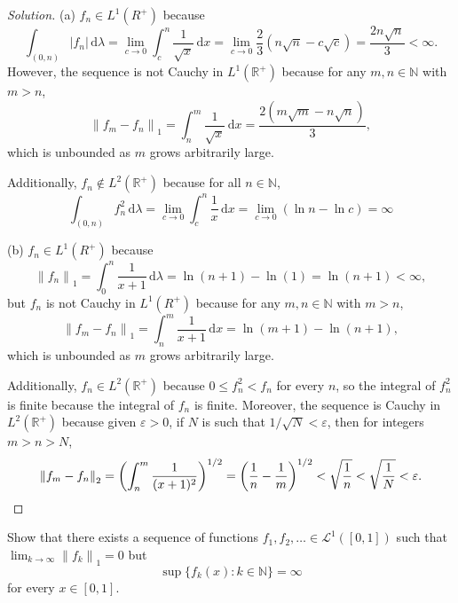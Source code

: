 \documentclass[10pt]{article}
\newcommand{\dd}{\,\mathrm{d}}
\providecommand{\eps}{\varepsilon}
\providecommand{\NN}{\mathbb N}
\providecommand{\RR}{\mathbb R}
\newenvironment{soln}{\begin{proof}[Solution]}{\end{proof}}
\providecommand{\abs}[1]{\left\lvert #1\right\rvert}
\providecommand{\norm}[1]{\left\| #1\right\|}
\begin{document}
\begin{soln}
    (a) $f_n\in L^1(R^+)$ because
    \begin{equation*}
	\int_{(0,n)}\abs{f_n}\dd\lambda
	= \lim_{c\to0}\int_c^n \frac 1{\sqrt x}\dd x
	= \lim_{c\to0}\frac 23(n\sqrt n - c\sqrt c) = \frac{2n\sqrt n}3 < \infty.
    \end{equation*}
    However, the sequence is not Cauchy in $L^1(\RR^+)$ because
    for any $m,n\in\NN$ with $m > n$,
    \begin{equation*}
	\norm{f_m-f_n}_1 = \int_n^m \frac 1{\sqrt x}\dd x
	= \frac{2(m\sqrt m - n\sqrt n)}3,
    \end{equation*}
    which is unbounded as $m$ grows arbitrarily large.

    Additionally, $f_n\notin L^2(\RR^+)$ because for all $n\in\NN$,
    \begin{equation*}
	\int_{(0,n)} f_n^2\dd\lambda
	= \lim_{c\to 0}\int_c^n\frac 1x\dd x
	= \lim_{c\to 0}(\ln n - \ln c) = \infty
    \end{equation*}
    
    (b) $f_n\in L^1(R^+)$ because
    \begin{equation*}
	\norm{f_n}_1 = \int_0^n \frac 1{x+1}\dd\lambda
	= \ln(n+1) - \ln(1) = \ln(n+1) < \infty,
    \end{equation*}
    but $f_n$ is not Cauchy in $L^1(R^+)$ because
    for any $m,n\in\NN$ with $m > n$,
    \begin{equation*}
	\norm{f_m - f_n}_1 = \int_n^m \frac 1{x+1}\dd x
	= \ln(m+1) - \ln(n+1),
    \end{equation*}
    which is unbounded as $m$ grows arbitrarily large.

    Additionally, $f_n\in L^2(\RR^+)$ because $0\le f_n^2 < f_n$
    for every $n$, so the integral of $f_n^2$ is finite
    because the integral of $f_n$ is finite.
    Moreover, the sequence is Cauchy in $L^2(\RR^+)$ because
    given $\eps>0$, if $N$ is such that $1/\sqrt{N} < \eps$,
    then for integers $m > n> N$,
    \begin{equation*}
	\norm{f_m-f_n}_2 = \left(\int_n^m \frac1{(x+1)^2}\right)^{1/2}
	= \left(\frac 1n - \frac 1m\right)^{1/2}
	< \sqrt{\frac 1n} < \sqrt{\frac 1N} < \eps.\qedhere
    \end{equation*}
\end{soln}

\begin{problem}
    [Axler 7B \#12]
    Show that there exists a sequence of functions
    $f_1,f_2,\ldots\in\mathcal L^1([0,1])$ such that
    $\lim_{k\to\infty}\norm{f_k}_1 = 0$ but
    \begin{equation*}
	\sup\{f_k(x) : k\in\NN\} = \infty
    \end{equation*}
    for every $x\in[0,1]$.
\end{problem}
\end{document}
